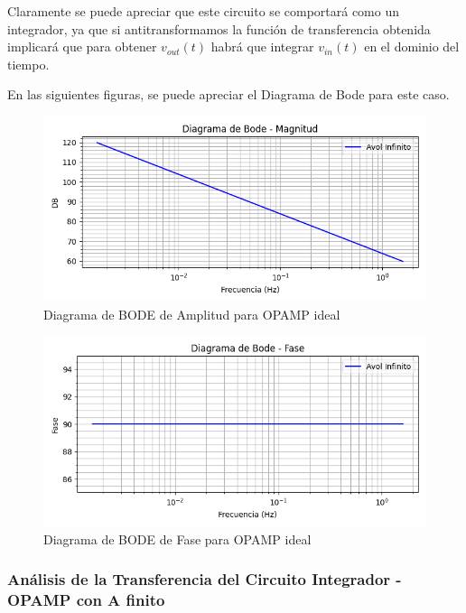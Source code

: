 Claramente se puede apreciar que este circuito se comportará como un integrador, ya que si antitransformamos la función de transferencia
obtenida implicará que para obtener $v_{out}(t)$ habrá que integrar $v_{in}(t)$ en el dominio del tiempo.

En las siguientes figuras, se puede apreciar el Diagrama de Bode para este caso.

\begin{figure}[H]
    \centering 
    \includegraphics [scale=1] {../Ejercicio3-CircuitoIntegradoresyDerivadores/Imagenes/diagrama-bode-ideal-amplitud.png} 
    \caption{Diagrama de BODE de Amplitud para OPAMP ideal}
    \label{fig:emptyPlotTool}
\end{figure}

\begin{figure}[H]
    \centering 
    \includegraphics [scale=1] {../Ejercicio3-CircuitoIntegradoresyDerivadores/Imagenes/diagrama-bode-ideal-fase.png} 
    \caption{Diagrama de BODE de Fase para OPAMP ideal}
    \label{fig:emptyPlotTool}
\end{figure}

\subsubsection{Análisis de la Transferencia del Circuito Integrador - OPAMP con A finito}


